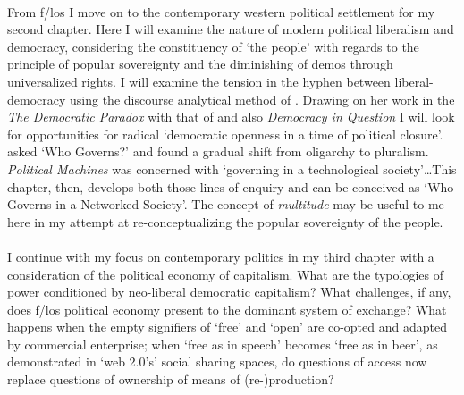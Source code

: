 \documentclass{article}
\begin{document}
\begin{doublespace}
\paragraph{}From f/los I move on to the contemporary western political settlement for my second chapter. Here I will examine the nature of modern political liberalism and democracy, considering the constituency of `the people' with regards to the principle of popular sovereignty and the diminishing of demos through universalized rights. I will examine the tension in the hyphen between  liberal-democracy using the discourse analytical method of . Drawing on her work in the \emph{The Democratic Paradox} with that of  and also  \emph{Democracy in Question} I will look for opportunities for radical `democratic openness in a time of political closure'.  asked `Who Governs?' and found a gradual shift from oligarchy to pluralism.  \emph{Political Machines} was concerned with `governing in a technological society'\ldots This chapter, then, develops both those lines of enquiry and can be conceived as `Who Governs in a Networked Society'. The concept of \emph{multitude} \cite{Hardt:2005zt} may be useful to me here in my attempt at re-conceptualizing the popular sovereignty of the people.

\paragraph{}I continue with my focus on contemporary politics in my third chapter with a consideration of the political economy of capitalism. What are the typologies of power conditioned by neo-liberal democratic capitalism? What challenges, if any, does f/los political economy present to the dominant system of exchange? What happens when the empty signifiers of `free' and `open' are co-opted and adapted by commercial enterprise; when `free as in speech' becomes `free as in beer', as demonstrated in `web 2.0's' social sharing spaces, do questions of access now replace questions of ownership of means of (re-)production? 


\end{doublespace}
\end{document}
